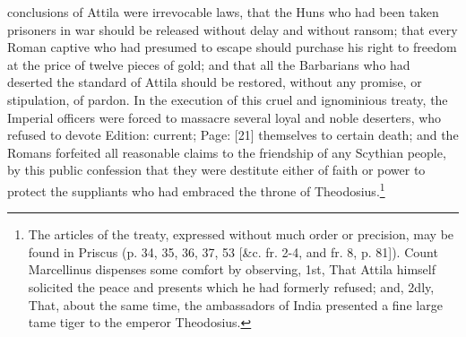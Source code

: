 conclusions of Attila were irrevocable laws, that the Huns who had been taken prisoners in war should be released without delay and without ransom; that every Roman captive who had presumed to escape should purchase his right to freedom at the price of twelve pieces of gold; and that all the Barbarians who had deserted the standard of Attila should be restored, without any promise, or stipulation, of pardon. In the execution of this cruel and ignominious treaty, the Imperial officers were forced to massacre several loyal and noble deserters, who refused to devote Edition: current; Page: [21] themselves to certain death; and the Romans forfeited all reasonable claims to the friendship of any Scythian people, by this public confession that they were destitute either of faith or power to protect the suppliants who had embraced the throne of Theodosius.\footnote{The articles of the treaty, expressed without much order or precision, may be found in Priscus (p. 34, 35, 36, 37, 53 [\&c. fr. 2-4, and fr. 8, p. 81]). Count Marcellinus dispenses some comfort by observing, 1st, That Attila himself solicited the peace and presents which he had formerly refused; and, 2dly, That, about the same time, the ambassadors of India presented a fine large tame tiger to the emperor Theodosius.}

